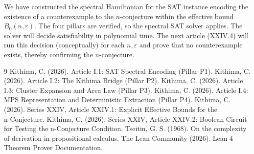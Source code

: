 \documentclass[11pt,a4paper]{article}
\begin{document}
We have constructed the spectral Hamiltonian for the SAT instance encoding the existence of a counterexample to the $n$-conjecture within the effective bound $B_0(n,\varepsilon)$. The four pillars are verified, so the spectral SAT solver applies. The solver will decide satisfiability in polynomial time. The next article (XXIV.4) will run this decision (conceptually) for each $n,\varepsilon$ and prove that no counterexample exists, thereby confirming the $n$-conjecture.


\begin{thebibliography}{9}
  Kithima, C. (2026). Article I.1: SAT Spectral Encoding (Pillar P1).
  Kithima, C. (2026). Article I.2: The Kithima Bridge (Pillar P2).
  Kithima, C. (2026). Article I.3: Cluster Expansion and Area Law (Pillar P3).
  Kithima, C. (2026). Article I.4: MPS Representation and Deterministic Extraction (Pillar P4).
  Kithima, C. (2026). Series XXIV, Article XXIV.1: Explicit Effective Bounds for the n‑Conjecture.
  Kithima, C. (2026). Series XXIV, Article XXIV.2: Boolean Circuit for Testing the n‑Conjecture Condition.
  Tseitin, G. S. (1968). On the complexity of derivation in propositional calculus.
  The Lean Community (2026). Lean 4 Theorem Prover Documentation.
\end{thebibliography}
\end{document}
